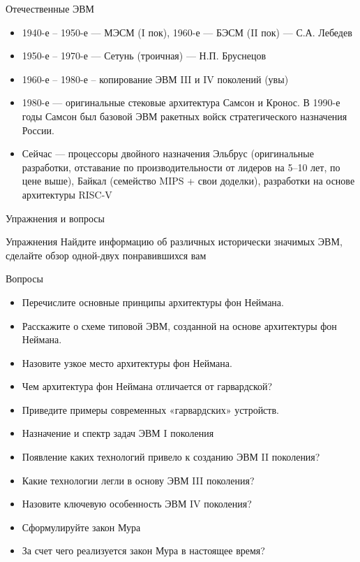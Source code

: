\documentclass[xetex,aspectratio=43]{beamer}
\begin{document}
\begin{frame}{Отечественные ЭВМ}
	\begin{itemize}
		\item
		1940-е -- 1950-е --- МЭСМ (I пок), 1960-е --- БЭСМ (II пок) --- С.А.
		Лебедев
		\item
		1950-е -- 1970-е --- Сетунь (троичная) --- Н.П. Бруснецов
		\item
		1960-е -- 1980-е -- копирование ЭВМ III и IV поколений (увы)
		\item
		1980-е --- оригинальные стековые архитектура Самсон и Кронос. В 1990-е
		годы Самсон был базовой ЭВМ ракетных войск стратегического назначения
		России.
		\item
		Сейчас --- процессоры двойного назначения Эльбрус (оригинальные
		разработки, отставание по производительности от лидеров на 5--10 лет,
		по цене выше), Байкал (семейство MIPS + свои доделки), разработки на
		основе архитектуры RISC-V
	\end{itemize}
\end{frame}

\begin{frame}{Упражнения и вопросы}
	\begin{block}{Упражнения}
		Найдите информацию об различных исторически значимых ЭВМ, сделайте обзор
		одной-двух понравившихся вам
	\end{block}

	\begin{block}{Вопросы}
		\begin{itemize}
			\tightlist
			\item
			Перечислите основные принципы архитектуры фон Неймана.
			\item
			Расскажите о схеме типовой ЭВМ, созданной на основе архитектуры фон
			Неймана.
			\item
			Назовите узкое место архитектуры фон Неймана.
			\item
			Чем архитектура фон Неймана отличается от гарвардской?
			\item
			Приведите примеры современных «гарвардских» устройств.
			\item
			Назначение и спектр задач ЭВМ I поколения
			\item
			Появление каких технологий привело к созданию ЭВМ II поколения?
			\item
			Какие технологии легли в основу ЭВМ III поколения?
			\item
			Назовите ключевую особенность ЭВМ IV поколения?
			\item
			Сформулируйте закон Мура
			\item
			За счет чего реализуется закон Мура в настоящее время?
		\end{itemize}
	\end{block}
\end{frame}

\postamble
\end{document}
